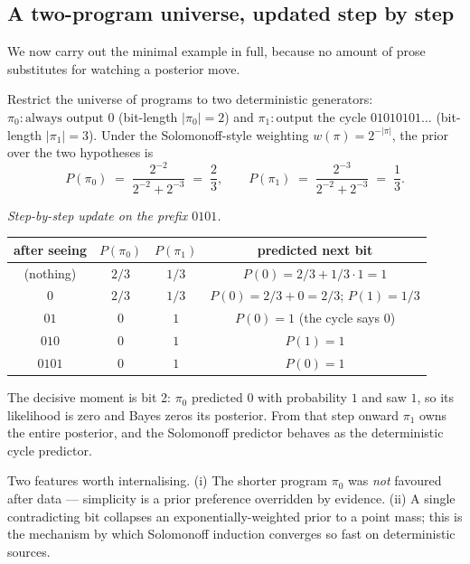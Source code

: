 \subsection*{A two-program universe, updated step by step}

We now carry out the minimal example in full, because no amount of
prose substitutes for watching a posterior move.

\begin{example}
\label{ex:toy-solomonoff}
Restrict the universe of programs to two deterministic generators:
$\pi_0 : \text{always output }0$ (bit-length $|\pi_0| = 2$) and
$\pi_1 : \text{output the cycle } 01010101\ldots$ (bit-length
$|\pi_1| = 3$).  Under the Solomonoff-style weighting
$w(\pi) = 2^{-|\pi|}$, the prior over the two hypotheses is
\[
  P(\pi_0) \;=\; \frac{2^{-2}}{2^{-2} + 2^{-3}} \;=\; \frac{2}{3},
  \qquad
  P(\pi_1) \;=\; \frac{2^{-3}}{2^{-2} + 2^{-3}} \;=\; \frac{1}{3}.
\]

\noindent\emph{Step-by-step update on the prefix $0101$.}

\begin{center}
\begin{tabular}{c|cc|c}
after seeing & $P(\pi_0)$ & $P(\pi_1)$ & predicted next bit \\\hline
(nothing) & $2/3$ & $1/3$ & $P(0)=2/3+1/3\cdot 1=1$ \\
$0$       & $2/3$ & $1/3$ & $P(0)=2/3+0=2/3$; $P(1)=1/3$ \\
$01$      & $0$   & $1$   & $P(0)=1$ (the cycle says $0$) \\
$010$     & $0$   & $1$   & $P(1)=1$ \\
$0101$    & $0$   & $1$   & $P(0)=1$ \\
\end{tabular}
\end{center}

\noindent The decisive moment is bit 2: $\pi_0$ predicted $0$ with
probability $1$ and saw $1$, so its likelihood is zero and Bayes
zeros its posterior.  From that step onward $\pi_1$ owns the entire
posterior, and the Solomonoff predictor behaves as the deterministic
cycle predictor.

Two features worth internalising.  (i) The shorter program $\pi_0$
was \emph{not} favoured after data --- simplicity is a prior
preference overridden by evidence.  (ii) A single contradicting bit
collapses an exponentially-weighted prior to a point mass; this is
the mechanism by which Solomonoff induction converges so fast on
deterministic sources.


\end{example}
